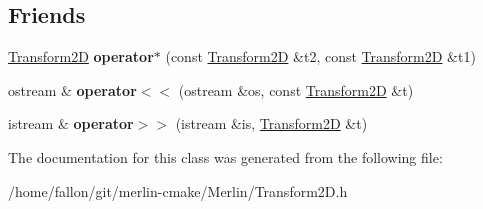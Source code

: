 \subsection*{Friends}
\begin{DoxyCompactItemize}
\item 
\mbox{\label{classTransform2D_a28fff51d8ff5f34bb5ad0cf777effd76}} 
\hyperlink{classTransform2D}{Transform2D} {\bfseries operator$\ast$} (const \hyperlink{classTransform2D}{Transform2D} \&t2, const \hyperlink{classTransform2D}{Transform2D} \&t1)
\item 
\mbox{\label{classTransform2D_a7a9845acf0924672cce52abb77b4609d}} 
ostream \& {\bfseries operator$<$$<$} (ostream \&os, const \hyperlink{classTransform2D}{Transform2D} \&t)
\item 
\mbox{\label{classTransform2D_ad5ad7c9990a9dd10ca4c6e1c5e947f9d}} 
istream \& {\bfseries operator$>$$>$} (istream \&is, \hyperlink{classTransform2D}{Transform2D} \&t)
\end{DoxyCompactItemize}


The documentation for this class was generated from the following file\+:\begin{DoxyCompactItemize}
\item 
/home/fallon/git/merlin-\/cmake/\+Merlin/Transform2\+D.\+h\end{DoxyCompactItemize}
